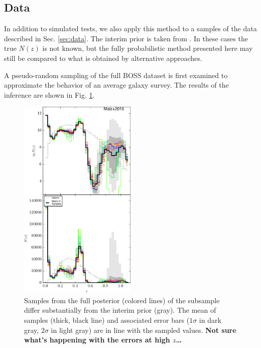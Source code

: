 \documentclass[preprint]{aastex}
\begin{document}
\clearpage
\subsection{Data}
\label{sec:boss}

In addition to simulated tests, we also apply this method to a samples of the 
data described in Sec. \ref{sec:data}.  The interim prior is taken from 
\citet{Sheldon2012}.  In these cases the true $N(z)$ is not known, but the 
fully probabilistic method presented here may still be compared to what is 
obtained by alternative approaches.

A pseudo-random sampling of the full BOSS dataset is first examined to 
approximate the behavior of an average galaxy survey.  The results of the 
inference are shown in Fig. \ref{fig:dataparam}.

\begin{figure}
\includegraphics[width=0.5\textwidth]{figs/boss/samps.pdf}
\caption{Samples from the full posterior (colored lines) of the subsample 
differ substantially from the interim prior (gray).  The mean of samples 
(thick, black line) and associated error bars ($1\sigma$ in dark gray, 
$2\sigma$ in light gray) are in line with the sampled values.  \textbf{Not sure 
what's happening with the errors at high $z$\dots}}
\label{fig:dataparam}
\end{figure}
\end{document}
